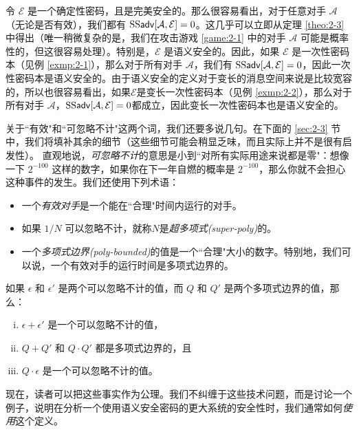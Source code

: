 \begin{example}\label{exmp:2-9}
令 $\mathcal{E}$ 是一个确定性密码，且是完美安全的。那么很容易看出，对于任意对手 $\mathcal{A}$（无论是否有效），我们都有 ${\rm SS\mathsf{adv}}[\mathcal{A},\mathcal{E}]=0$。这几乎可以立即从定理 \ref{theo:2-3} 中得出（唯一稍微复杂的是，我们在攻击游戏 \ref{game:2-1} 中的对手 $\mathcal{A}$ 可能是概率性的，但这很容易处理）。特别是，$\mathcal{E}$ 是语义安全的。因此，如果 $\mathcal{E}$ 是一次性密码本（见例 \ref{exmp:2-1}），那么对于所有对手 $\mathcal{A}$，我们有 ${\rm SS\mathsf{adv}}[\mathcal{A},\mathcal{E}]=0$，因此一次性密码本是语义安全的。由于语义安全的定义对于变长的消息空间来说是比较宽容的，所以也很容易看出，如果$\mathcal{E}$是变长一次性密码本（见例 \ref{exmp:2-2}），那么对于所有对手 $\mathcal{A}$，${\rm SS\mathsf{adv}}[\mathcal{A},\mathcal{E}]=0$都成立，因此变长一次性密码本也是语义安全的。
\end{example}

关于``有效"和``可忽略不计"这两个词，我们还要多说几句。在下面的 \ref{sec:2-3} 节中，我们将填补其余的细节（这些细节可能会稍显乏味，而且实际上并不是很有启发性）。 直观地说，\emph{可忽略不计}的意思是小到``对所有实际用途来说都是零"：想像一下 $2^{-100}$ 这样的数字，如果你在下一年自燃的概率是 $2^{-100}$，那么你就不会担心这种事件的发生。我们还使用下列术语：
\begin{itemize}
	\item 一个\emph{有效对手}是一个能在``合理"时间内运行的对手。
	\item 如果 ${1}/{N}$ 可以忽略不计，就称$N$是\emph{超多项式(super-poly)}的。
	\item 一个\emph{多项式边界(poly-bounded)}的值是一个``合理"大小的数字。特别地，我们可以说，一个有效对手的运行时间是多项式边界的。
\end{itemize}

\begin{fact}\label{fact:2-6}
如果 $\epsilon$ 和 $\epsilon'$ 是两个可以忽略不计的值，而 $Q$ 和 $Q'$ 是两个多项式边界的值，那么：
\begin{enumerate}[(i)]
	\item $\epsilon+\epsilon'$ 是一个可以忽略不计的值，
	\item $Q + Q'$ 和 $Q\cdot Q'$ 都是多项式边界的，且
	\item $Q\cdot\epsilon$ 是一个可以忽略不计的值。
\end{enumerate}
\end{fact}



现在，读者可以把这些事实作为公理。我们不纠缠于这些技术问题，而是讨论一个例子，说明在分析一个使用语义安全密码的更大系统的安全性时，我们通常如何\emph{使用}这个定义。

